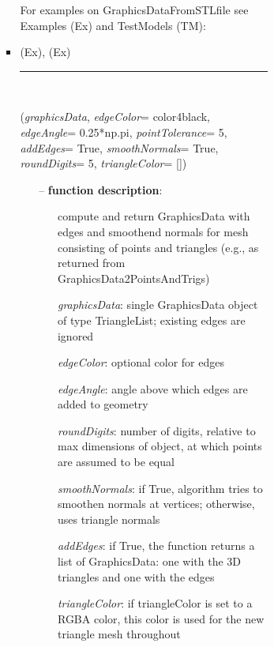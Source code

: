 \begin{itemize}[leftmargin=1.4cm]
\begin{itemize}[leftmargin=1.4cm]
\begin{itemize}[leftmargin=0.5cm]
\begin{itemize}[leftmargin=1.4cm]
\begin{itemize}[leftmargin=1.4cm]
\begin{itemize}[leftmargin=0.5cm]
\begin{itemize}[leftmargin=1.4cm]
\begin{itemize}[leftmargin=0.5cm]
%
%
\noindent For examples on GraphicsDataFromSTLfile see Examples (Ex) and TestModels (TM):
\bi
 \item \footnotesize {} (Ex), 
 (Ex)\ei

%
\noindent\rule{8cm}{0.75pt}\vspace{1pt} \\ 
\begin{flushleft}
\label{sec:graphicsDataUtilities:AddEdgesAndSmoothenNormals}
({\it graphicsData}, {\it edgeColor}= color4black, {\it edgeAngle}= 0.25*np.pi, {\it pointTolerance}= 5, {\it addEdges}= True, {\it smoothNormals}= True, {\it roundDigits}= 5, {\it triangleColor}= [])
\end{flushleft}
\setlength{\itemindent}{0.7cm}
\begin{itemize}[leftmargin=0.7cm]
  \item[--]  {\bf function description}: \vspace{-6pt}
  \begin{itemize}[leftmargin=1.2cm]
\setlength{\itemindent}{-0.7cm}
    \item[] compute and return GraphicsData with edges and smoothend normals for mesh consisting of points and triangles (e.g., as returned from GraphicsData2PointsAndTrigs)
    \item[] {\it   graphicsData}: single GraphicsData object of type TriangleList; existing edges are ignored
    \item[] {\it   edgeColor}: optional color for edges
    \item[] {\it   edgeAngle}: angle above which edges are added to geometry
    \item[] {\it   roundDigits}: number of digits, relative to max dimensions of object, at which points are assumed to be equal
    \item[] {\it   smoothNormals}: if True, algorithm tries to smoothen normals at vertices; otherwise, uses triangle normals
    \item[] {\it   addEdges}: if True, the function returns a list of GraphicsData: one with the 3D triangles and one with the edges
    \item[] {\it   triangleColor}: if triangleColor is set to a RGBA color, this color is used for the new triangle mesh throughout

\end{itemize}
\end{itemize}
\end{itemize}
\end{itemize}
\end{itemize}
\end{itemize}
\end{itemize}
\end{itemize}
\end{itemize}
\end{itemize}
